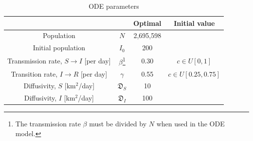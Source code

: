 \documentclass[11pt]{article}
\newcommand{\D}{\mathfrak{D}}
\begin{document}
\begin{savenotes}
\begin{table}[h]
	\centering
	\caption{ODE parameters}
	\label{tab:parameters}
	\begin{tabular}{ c c c c }
		\hline
		\hline
			&	&	Optimal	&	Initial value \\
		\hline
		Population	&	$N$	&	2,695,598 \\
		Initial population	&	$I_0$	&	200 \\
		Transmission rate, $S \rightarrow I$ [per day]	&	$\beta$\footnote{The transmission rate $\beta$ must be divided by $N$ when used in the ODE model.}	&	0.30	&	$c \in U[0,1]$ \\
		Transition rate, $I \rightarrow R$ [per day]	&	$\gamma$	&	0.55	&	$c \in U[0.25,0.75]$ \\
		Diffusivity, $S$ [km$^2$/day]	&	$\D_S$	&	10	&	\\
		Diffusivity, $I$ [km$^2$/day]	&	$\D_I$	&	100	&	\\
		\hline
		\hline
	\end{tabular}
\end{table}
\end{savenotes}




\end{document}
